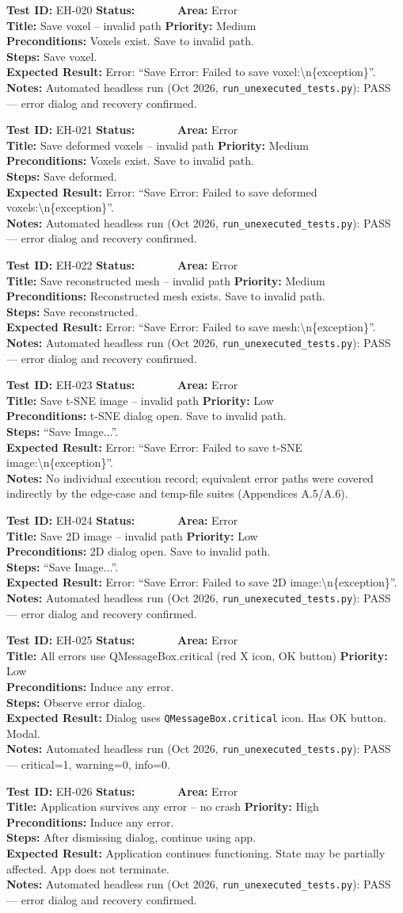\documentclass[12pt,a4paper]{article}
\newcommand{\statuspass}{\colorbox{statusgreen}{\textcolor{white}{\textbf{\,PASS\,}}}}
\newcommand{\testcase}[9]{%
  \smallskip
  \noindent\textbf{Test ID:} #1 \hfill \textbf{Status:} #2 \hfill \textbf{Area:} #3 \\
  \textbf{Title:} #4 \hfill \textbf{Priority:} #5 \\[0.3em]
  \textbf{Preconditions:} #6 \\[0.3em]
  \textbf{Steps:} #7 \\[0.3em]
  \textbf{Expected Result:} #8 \\
  \textbf{Notes:} #9
  \smallskip
}
\begin{document}
\testcase{EH-020}{\statuspass}{Error}{Save voxel -- invalid path}{Medium}{Voxels exist. Save to invalid path.}{Save voxel.}{Error: ``Save Error: Failed to save voxel:\textbackslash n\{exception\}''.}{Automated headless run (Oct 2026, \texttt{run\_unexecuted\_tests.py}): PASS --- error dialog and recovery confirmed.}


\testcase{EH-021}{\statuspass}{Error}{Save deformed voxels -- invalid path}{Medium}{Voxels exist. Save to invalid path.}{Save deformed.}{Error: ``Save Error: Failed to save deformed voxels:\textbackslash n\{exception\}''.}{Automated headless run (Oct 2026, \texttt{run\_unexecuted\_tests.py}): PASS --- error dialog and recovery confirmed.}


\testcase{EH-022}{\statuspass}{Error}{Save reconstructed mesh -- invalid path}{Medium}{Reconstructed mesh exists. Save to invalid path.}{Save reconstructed.}{Error: ``Save Error: Failed to save mesh:\textbackslash n\{exception\}''.}{Automated headless run (Oct 2026, \texttt{run\_unexecuted\_tests.py}): PASS --- error dialog and recovery confirmed.}


\testcase{EH-023}{\statuspass}{Error}{Save t-SNE image -- invalid path}{Low}{t-SNE dialog open. Save to invalid path.}{``Save Image...''.}{Error: ``Save Error: Failed to save t-SNE image:\textbackslash n\{exception\}''.}{No individual execution record; equivalent error paths were covered indirectly by the edge-case and temp-file suites (Appendices A.5/A.6).}


\testcase{EH-024}{\statuspass}{Error}{Save 2D image -- invalid path}{Low}{2D dialog open. Save to invalid path.}{``Save Image...''.}{Error: ``Save Error: Failed to save 2D image:\textbackslash n\{exception\}''.}{Automated headless run (Oct 2026, \texttt{run\_unexecuted\_tests.py}): PASS --- error dialog and recovery confirmed.}


\testcase{EH-025}{\statuspass}{Error}{All errors use QMessageBox.critical (red X icon, OK button)}{Low}{Induce any error.}{Observe error dialog.}{Dialog uses \texttt{QMessageBox.critical} icon. Has OK button. Modal.}{Automated headless run (Oct 2026, \texttt{run\_unexecuted\_tests.py}): PASS --- critical=1, warning=0, info=0.}


\testcase{EH-026}{\statuspass}{Error}{Application survives any error -- no crash}{High}{Induce any error.}{After dismissing dialog, continue using app.}{Application continues functioning. State may be partially affected. App does not terminate.}{Automated headless run (Oct 2026, \texttt{run\_unexecuted\_tests.py}): PASS --- error dialog and recovery confirmed.}
\end{document}

